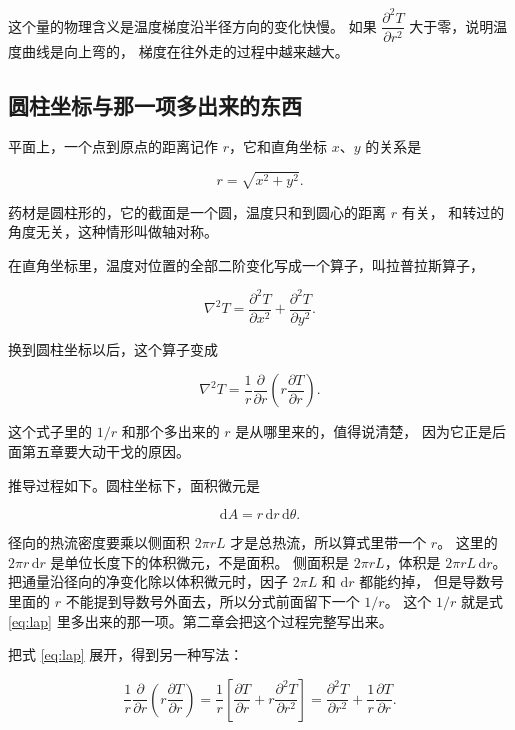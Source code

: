 这个量的物理含义是温度梯度沿半径方向的变化快慢。
如果 $\dfrac{\partial^2 T}{\partial r^2}$ 大于零，说明温度曲线是向上弯的，
梯度在往外走的过程中越来越大。

\subsection{圆柱坐标与那一项多出来的东西}

平面上，一个点到原点的距离记作 $r$，它和直角坐标 $x$、$y$ 的关系是

\begin{equation}
r = \sqrt{x^2+y^2}.
\end{equation}

药材是圆柱形的，它的截面是一个圆，温度只和到圆心的距离 $r$ 有关，
和转过的角度无关，这种情形叫做轴对称。

在直角坐标里，温度对位置的全部二阶变化写成一个算子，叫拉普拉斯算子，

\begin{equation}
\nabla^2 T = \frac{\partial^2 T}{\partial x^2}+\frac{\partial^2 T}{\partial y^2}.
\end{equation}

换到圆柱坐标以后，这个算子变成

\begin{equation}
\nabla^2 T = \frac{1}{r}\frac{\partial}{\partial r}\left(r\frac{\partial T}{\partial r}\right).
\label{eq:lap}
\end{equation}

这个式子里的 $1/r$ 和那个多出来的 $r$ 是从哪里来的，值得说清楚，
因为它正是后面第五章要大动干戈的原因。

推导过程如下。圆柱坐标下，面积微元是

\begin{equation}
\mathrm{d}A = r\,\mathrm{d}r\,\mathrm{d}\theta .
\end{equation}

径向的热流密度要乘以侧面积 $2\pi rL$ 才是总热流，所以算式里带一个 $r$。
这里的 $2\pi r\,\mathrm{d}r$ 是单位长度下的体积微元，不是面积。
侧面积是 $2\pi rL$，体积是 $2\pi rL\,\mathrm{d}r$。
把通量沿径向的净变化除以体积微元时，因子 $2\pi L$ 和 $\mathrm{d}r$ 都能约掉，
但是导数号里面的 $r$ 不能提到导数号外面去，所以分式前面留下一个 $1/r$。
这个 $1/r$ 就是式 \eqref{eq:lap} 里多出来的那一项。第二章会把这个过程完整写出来。

把式 \eqref{eq:lap} 展开，得到另一种写法：

\begin{equation}
\frac{1}{r}\frac{\partial}{\partial r}\left(r\frac{\partial T}{\partial r}\right)
= \frac{1}{r}\left[\frac{\partial T}{\partial r} + r\frac{\partial^2 T}{\partial r^2}\right]
= \frac{\partial^2 T}{\partial r^2} + \frac{1}{r}\frac{\partial T}{\partial r}.
\label{eq:lap-expand}
\end{equation}

